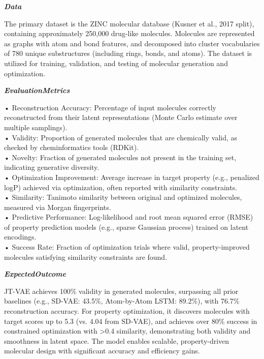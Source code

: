 \begin{tcolorbox}[
    breakable,
    title={Example of Idea Generation in Chemistry},
    colback=LighterGray,
    colframe=DeepPurple,
    colbacktitle=DeepPurple,
    coltitle=White,
]
\textbf{\emph{\textcolor{CaseOrange}{Data}}}

The primary dataset is the ZINC molecular database (Kusner et al., 2017 split), containing
approximately 250,000 drug-like molecules. Molecules are represented as graphs with atom and bond
features, and decomposed into cluster vocabularies of 780 unique substructures (including rings,
bonds, and atoms). The dataset is utilized for training, validation, and testing of molecular
generation and optimization.

\textbf{\emph{\textcolor{CaseOrange}{EvaluationMetrics}}}

• Reconstruction Accuracy: Percentage of input molecules correctly reconstructed from their latent representations (Monte Carlo estimate over multiple samplings). \\
• Validity: Proportion of generated molecules that are chemically valid, as checked by cheminformatics tools (RDKit). \\
• Novelty: Fraction of generated molecules not present in the training set, indicating generative diversity. \\
• Optimization Improvement: Average increase in target property (e.g., penalized logP) achieved via optimization, often reported with similarity constraints. \\
• Similarity: Tanimoto similarity between original and optimized molecules, measured via Morgan fingerprints. \\
• Predictive Performance: Log-likelihood and root mean squared error (RMSE) of property prediction models (e.g., sparse Gaussian process) trained on latent encodings. \\
• Success Rate: Fraction of optimization trials where valid, property-improved molecules satisfying similarity constraints are found. 

\textbf{\emph{\textcolor{CaseOrange}{ExpectedOutcome}}}

JT-VAE achieves 100\% validity in generated molecules, surpassing all prior baselines (e.g., SD-VAE:
43.5\%, Atom-by-Atom LSTM: 89.2\%), with 76.7\% reconstruction accuracy. For property optimization,
it discovers molecules with target scores up to 5.3 (vs. 4.04 from SD-VAE), and achieves over 80\%
success in constrained optimization with >0.4 similarity, demonstrating both validity and smoothness
in latent space. The model enables scalable, property-driven molecular design with significant
accuracy and efficiency gains.

\end{tcolorbox}



